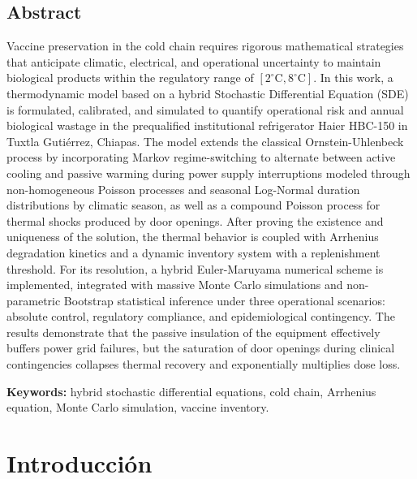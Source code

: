 \documentclass[
  spanish,
  us-letterpaper,
]{scrreprt}
\numberwithin{equation}{section}
\theoremstyle{plain}
\theoremstyle{plain}
\theoremstyle{definition}
\theoremstyle{plain}
\theoremstyle{remark}
\begin{document}
\section{Abstract}\label{abstract}

Vaccine preservation in the cold chain requires rigorous mathematical
strategies that anticipate climatic, electrical, and operational
uncertainty to maintain biological products within the regulatory range
of \([2^\circ\text{C}, 8^\circ\text{C}]\). In this work, a thermodynamic
model based on a hybrid Stochastic Differential Equation (SDE) is
formulated, calibrated, and simulated to quantify operational risk and
annual biological wastage in the prequalified institutional refrigerator
Haier HBC-150 in Tuxtla Gutiérrez, Chiapas. The model extends the
classical Ornstein-Uhlenbeck process by incorporating Markov
regime-switching to alternate between active cooling and passive warming
during power supply interruptions modeled through non-homogeneous
Poisson processes and seasonal Log-Normal duration distributions by
climatic season, as well as a compound Poisson process for thermal
shocks produced by door openings. After proving the existence and
uniqueness of the solution, the thermal behavior is coupled with
Arrhenius degradation kinetics and a dynamic inventory system with a
replenishment threshold. For its resolution, a hybrid Euler-Maruyama
numerical scheme is implemented, integrated with massive Monte Carlo
simulations and non-parametric Bootstrap statistical inference under
three operational scenarios: absolute control, regulatory compliance,
and epidemiological contingency. The results demonstrate that the
passive insulation of the equipment effectively buffers power grid
failures, but the saturation of door openings during clinical
contingencies collapses thermal recovery and exponentially multiplies
dose loss.

\textbf{Keywords:} hybrid stochastic differential equations, cold chain,
Arrhenius equation, Monte Carlo simulation, vaccine inventory.


\chapter{Introducción}\label{introducciuxf3n}
\end{document}
